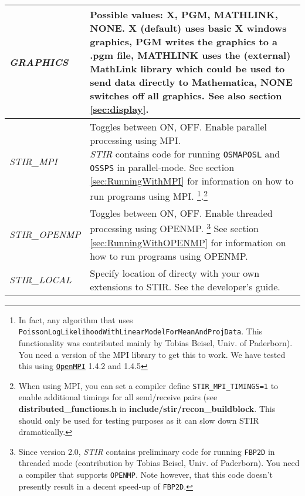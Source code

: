 \documentclass{article}
\def\url#1#2{\mbox{\href{#1}{\tt #2}}}
\begin{document}
\begin{longtable}{|p{\MakeTableFirstCol}|p{\MakeTableSecondCol}|}
\hline
{\raggedright \textit{GRAPHICS}} & 
{\raggedright Possible values: X, PGM, MATHLINK, NONE. X (default) uses basic 
X windows graphics, PGM writes the graphics to a .pgm file, MATHLINK 
uses the (external) MathLink library which could be used to send 
data directly to Mathematica, NONE switches off all graphics. See also section \ref{sec:display}.
} \\
\hline
{\raggedright \textit{STIR\_MPI}} & 
{\raggedright Toggles between ON, OFF. Enable parallel processing using MPI.\\
\textit{STIR} contains code for running \texttt{OSMAPOSL} and \texttt{OSSPS} in parallel-mode. 
See section \ref{sec:RunningWithMPI} for information on how to run programs using MPI.
\footnote{In fact, any algorithm that uses \texttt{PoissonLogLikelihoodWithLinearModelForMeanAndProjData}.
This functionality was contributed mainly by Tobias Beisel, Univ. of Paderborn). You need a version of the MPI library 
to get this to work. We have tested this using \url{http://www.open-mpi.org/}{OpenMPI} 1.4.2 and 1.4.5}.\footnote{
{When using MPI, you can set a compiler define \texttt{STIR\_MPI\_TIMINGS=1}} to
enable additional timings for all send/receive pairs 
(see \textbf{distributed\_functions.h} in \textbf{include/stir/recon\_buildblock}. 
This should only be used for testing purposes as it can slow down
STIR dramatically.}
} \\
\hline
{\raggedright \textit{STIR\_OPENMP}} & 
{\raggedright Toggles between ON, OFF. Enable threaded processing using OPENMP.
\footnote{Since version 2.0, \textit{STIR} contains preliminary code for running \texttt{FBP2D} in threaded mode
(contribution by Tobias Beisel, Univ. of Paderborn). You need a compiler that 
supports \texttt{OPENMP}. Note however, that this code doesn't presently result 
in a decent speed-up of \texttt{FBP2D}.}
See section \ref{sec:RunningWithOPENMP} for information on how to run programs using OPENMP.
} \\
\hline
{\raggedright \textit{STIR\_LOCAL}} & 
{\raggedright Specify location of directy with your own extensions to STIR. See
the developer's guide.}\\
\hline
\end{longtable}
\end{document}
